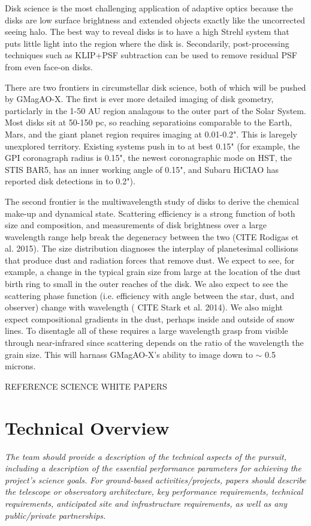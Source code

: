 \documentclass[12pt,preprint]{aastex}
\begin{document}
Disk science is the most challenging application of adaptive optics because
the disks are low surface brightness and extended objects exactly like the
uncorrected seeing halo. The best way to reveal disks is to have a high Strehl
system that puts little light into the region where the disk is. Secondarily,
post-processing techniques such as KLIP+PSF subtraction can be used to remove
residual PSF from even face-on disks.

There are two frontiers in circumstellar disk science, both of which will be
pushed by GMagAO-X. The first is ever more detailed imaging of disk geometry,
particlarly in the 1-50 AU region analagous to the outer part of the Solar
System. Most disks sit at 50-150 pc, so reaching separatioins comparable to the Earth, Mars, and the giant
planet region requires imaging at 0.01-0.2". This is laregely unexplored
territory. Existing systems push in to at best 0.15" (for example, the GPI
coronagraph radius is 0.15", the newest coronagraphic mode on HST, the STIS
BAR5, has an inner working angle of 0.15", and Subaru HiCIAO has reported disk
detections in to 0.2").  

The second frontier is the multiwavelength study of disks to derive the
chemical make-up and dynamical state.  Scattering efficiency is a strong
function of both size and composition, and measurements of disk brightness
over a large wavelength range help break the degeneracy between the two
(CITE Rodigas et al. 2015). The size distribution diagnoses the interplay of
planetesimal collisions that produce dust and radiation forces that remove
dust. We expect to see, for example, a change in the typical grain size from
large at the location of the dust birth ring to small in the outer reaches of
the disk. We also expect to see the scattering phase function (i.e. efficiency
with angle between the star, dust, and observer) change with wavelength ( CITE Stark
et al. 2014). We also might expect compositional gradients in the dust,
perhaps inside and outside of snow lines. To disentagle all of these requires
a large wavelength grasp from visible through near-infrared since scattering
depends on the ratio of the wavelength the grain size. This will harnass GMagAO-X's ability to
image down to $\sim$ 0.5 microns.

REFERENCE SCIENCE WHITE PAPERS



\section{Technical Overview}
\textit{The team should provide a description of the technical aspects of the
pursuit, including a description of the essential performance parameters for achieving the
project's science goals.}
\textit{For ground-based activities/projects, papers should describe the telescope or
observatory architecture, key performance requirements, technical requirements,
anticipated site and infrastructure requirements, as well as any public/private
partnerships.}
\end{document}
